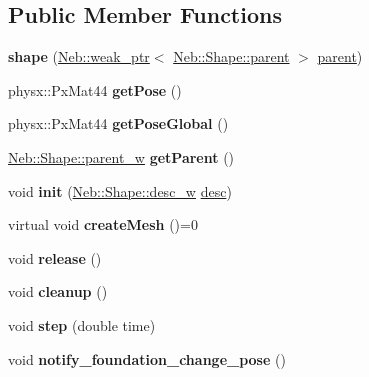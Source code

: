 \subsection*{\-Public \-Member \-Functions}
\begin{DoxyCompactItemize}
\item 
\hypertarget{classNeb_1_1Shape_1_1shape_ab541b376a9dc6c86368b0374efa72247}{{\bfseries shape} (\hyperlink{classNeb_1_1weak__ptr}{\-Neb\-::weak\-\_\-ptr}$<$ \hyperlink{classNeb_1_1Shape_1_1parent}{\-Neb\-::\-Shape\-::parent} $>$ \hyperlink{classNeb_1_1Shape_1_1parent}{parent})}\label{classNeb_1_1Shape_1_1shape_ab541b376a9dc6c86368b0374efa72247}

\item 
\hypertarget{classNeb_1_1Shape_1_1shape_a1af582be37e62e3e27227d101764887b}{physx\-::\-Px\-Mat44 {\bfseries get\-Pose} ()}\label{classNeb_1_1Shape_1_1shape_a1af582be37e62e3e27227d101764887b}

\item 
\hypertarget{classNeb_1_1Shape_1_1shape_a6e3e61b523dcb784ab30fee8cca44119}{physx\-::\-Px\-Mat44 {\bfseries get\-Pose\-Global} ()}\label{classNeb_1_1Shape_1_1shape_a6e3e61b523dcb784ab30fee8cca44119}

\item 
\hypertarget{classNeb_1_1Shape_1_1shape_a08849b8b742ef42de207091ff9598521}{\hyperlink{classNeb_1_1weak__ptr}{\-Neb\-::\-Shape\-::parent\-\_\-w} {\bfseries get\-Parent} ()}\label{classNeb_1_1Shape_1_1shape_a08849b8b742ef42de207091ff9598521}

\item 
\hypertarget{classNeb_1_1Shape_1_1shape_af467bc3c9286f1d10114480c9d5d0db0}{void {\bfseries init} (\hyperlink{classNeb_1_1weak__ptr}{\-Neb\-::\-Shape\-::desc\-\_\-w} \hyperlink{classNeb_1_1Shape_1_1desc}{desc})}\label{classNeb_1_1Shape_1_1shape_af467bc3c9286f1d10114480c9d5d0db0}

\item 
\hypertarget{classNeb_1_1Shape_1_1shape_aa7a6106b9e5901d903b527b171cf8800}{virtual void {\bfseries create\-Mesh} ()=0}\label{classNeb_1_1Shape_1_1shape_aa7a6106b9e5901d903b527b171cf8800}

\item 
\hypertarget{classNeb_1_1Shape_1_1shape_ada83179ec6b4f3737a6e5ef2eb29564d}{void {\bfseries release} ()}\label{classNeb_1_1Shape_1_1shape_ada83179ec6b4f3737a6e5ef2eb29564d}

\item 
\hypertarget{classNeb_1_1Shape_1_1shape_a7ce08185aa4431ec2f39fef1e1933a7a}{void {\bfseries cleanup} ()}\label{classNeb_1_1Shape_1_1shape_a7ce08185aa4431ec2f39fef1e1933a7a}

\item 
\hypertarget{classNeb_1_1Shape_1_1shape_adb1a3c375e57fbf636182719f4f8f2a3}{void {\bfseries step} (double time)}\label{classNeb_1_1Shape_1_1shape_adb1a3c375e57fbf636182719f4f8f2a3}

\item 
\hypertarget{classNeb_1_1Shape_1_1shape_ac96d4dc310d2393672bf331a9b4eaad9}{void {\bfseries notify\-\_\-foundation\-\_\-change\-\_\-pose} ()}\label{classNeb_1_1Shape_1_1shape_ac96d4dc310d2393672bf331a9b4eaad9}

\end{DoxyCompactItemize}
